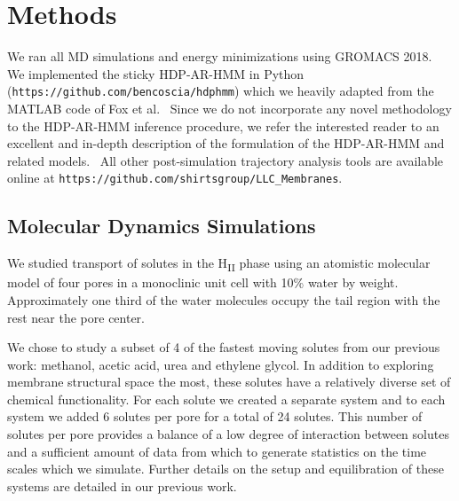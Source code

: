 \documentclass[journal=jpcbfk,manuscript=article]{achemso}
\begin{document}
  \section{Methods}
    
  We ran all MD simulations and energy minimizations using GROMACS 2018.~\cite{bekker_gromacs:_1993,berendsen_gromacs:_1995,van_der_spoel_gromacs:_2005,hess_gromacs_2008}  
  We implemented the sticky HDP-AR-HMM in Python 
  (\texttt{https://github.com/bencoscia/hdphmm}) which we heavily adapted from
  the MATLAB code of Fox et al.~\cite{fox_nonparametric_2009} Since we do not incorporate
  any novel methodology to the HDP-AR-HMM inference procedure, we refer the 
  interested reader to an excellent and in-depth description of the formulation of
  the HDP-AR-HMM and related models.~\cite{fox_bayesian_2010} 
  All other post-simulation trajectory analysis tools are available online at
  \texttt{https://github.com/shirtsgroup/LLC\_Membranes}.

  \subsection{Molecular Dynamics Simulations}

  We studied transport of solutes in the H\textsubscript{II} phase using an
  atomistic molecular model of four pores in a monoclinic unit cell with 
  10\% water by weight. Approximately one third of the water molecules 
  occupy the tail region with the rest near the pore center.%
  
  We chose to study a subset of 4 of the fastest moving solutes from our previous
  work: methanol, acetic acid, urea and ethylene glycol.
  In addition to exploring membrane structural space the most, these solutes have a
  relatively diverse set of chemical functionality. For each solute we created a 
  separate system and to each system we added 6 solutes per pore for a total of 24 solutes. This number 
  of solutes per pore provides a balance of a low degree of interaction between 
  solutes and a sufficient amount of data from which to generate statistics on the
  time scales which we simulate. Further details on the setup and equilibration of
  these systems are detailed in our previous work.\cite{coscia_chemically_2019}
  
\end{document}
